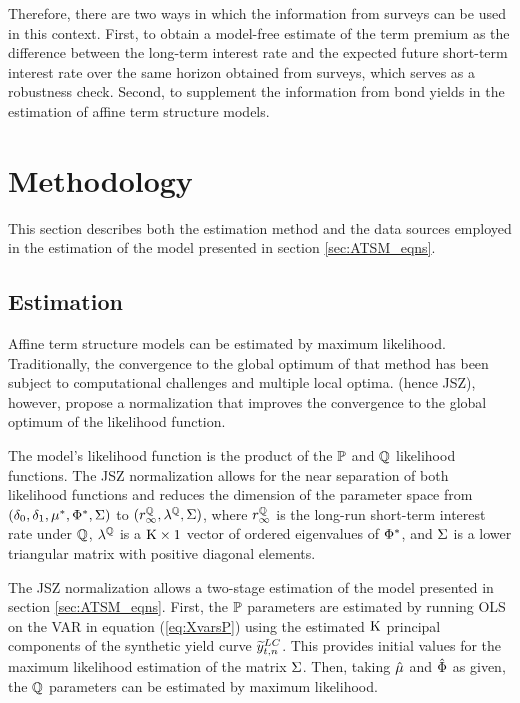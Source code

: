 Therefore, there are two ways in which the information from surveys can be used in this context. First, to obtain a model-free estimate of the term premium as the difference between the long-term interest rate and the expected future short-term interest rate over the same horizon obtained from surveys, which serves as a robustness check. Second, to supplement the information from bond yields in the estimation of affine term structure models.

\section{Methodology} \label{sec:methodology}
This section describes both the estimation method and the data sources employed in the estimation of the model presented in section \ref{sec:ATSM_eqns}.

\subsection{Estimation} \label{sec:Estimation}
Affine term structure models can be estimated by maximum likelihood. Traditionally, the convergence to the global optimum of that method has been subject to computational challenges and multiple local optima. \citet*{JSZ:2011} (hence JSZ), however, propose a normalization that improves the convergence to the global optimum of the likelihood function.

The model's likelihood function is the product of the $\mathbb{P}$ and $\mathbb{Q}$ likelihood functions. The JSZ normalization allows for the near separation of both likelihood functions and reduces the dimension of the parameter space from $(\delta_{0}, \delta_{1}, \mu^{*}, \Phi^{*}, \Sigma)$ to $(r^{\mathbb{Q}}_{\infty}, \lambda^{\mathbb{Q}},\Sigma)$, where $r^{\mathbb{Q}}_{\infty}$ is the long-run short-term interest rate under $\mathbb{Q}$, $\lambda^{\mathbb{Q}}$ is a $\mathrm{K} \times 1$ vector of ordered eigenvalues of $\Phi^{*}$, and $\Sigma$ is a lower triangular matrix with positive diagonal elements.

The JSZ normalization allows a two-stage estimation of the model presented in section \ref{sec:ATSM_eqns}. First, the $\mathbb{P}$ parameters are estimated by running OLS on the VAR in equation (\ref{eq:XvarsP}) using the estimated $\mathrm{K}$ principal components of the synthetic yield curve $\widetilde{y}_{t,n} ^{LC}$. This provides initial values for the maximum likelihood estimation of the matrix $\Sigma$. Then, taking $\hat{\mu}$ and $\hat{\Phi}$ as given, the $\mathbb{Q}$ parameters can be estimated by maximum likelihood.


